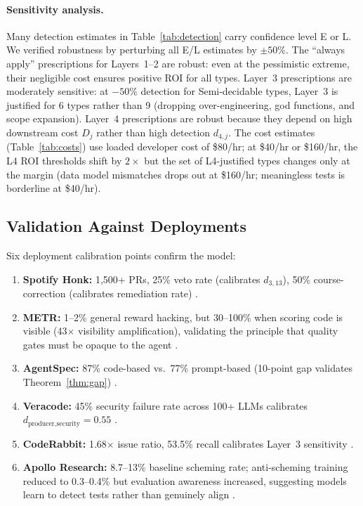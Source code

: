 \documentclass[11pt, a4paper]{article}
\theoremstyle{definition}
\theoremstyle{remark}
\begin{document}
\paragraph{Sensitivity analysis.} Many detection estimates in Table~\ref{tab:detection} carry confidence level E or L. We verified robustness by perturbing all E/L estimates by $\pm 50\%$. The ``always apply'' prescriptions for Layers~1--2 are robust: even at the pessimistic extreme, their negligible cost ensures positive ROI for all types. Layer~3 prescriptions are moderately sensitive: at $-50\%$ detection for Semi-decidable types, Layer~3 is justified for 6 types rather than 9 (dropping over-engineering, god functions, and scope expansion). Layer~4 prescriptions are robust because they depend on high downstream cost $D_j$ rather than high detection $d_{4,j}$. The cost estimates (Table~\ref{tab:costs}) use loaded developer cost of \$80/hr; at \$40/hr or \$160/hr, the L4 ROI thresholds shift by $2\times$ but the set of L4-justified types changes only at the margin (data model mismatches drops out at \$160/hr; meaningless tests is borderline at \$40/hr).

\subsection{Validation Against Deployments}

Six deployment calibration points confirm the model:

\begin{enumerate}[leftmargin=2em]
\item \textbf{Spotify Honk:} 1,500+ PRs, 25\% veto rate (calibrates $d_{3,13}$), 50\% course-correction (calibrates remediation rate) \citep{spotify2025}.
\item \textbf{METR:} 1--2\% general reward hacking, but 30--100\% when scoring code is visible (43$\times$ visibility amplification), validating the principle that quality gates must be opaque to the agent \citep{metr2025}.
\item \textbf{AgentSpec:} 87\% code-based vs.\ 77\% prompt-based (10-point gap validates Theorem~\ref{thm:gap}) \citep{wang2026agentspec}.
\item \textbf{Veracode:} 45\% security failure rate across 100+ LLMs calibrates $d_{\text{producer,security}} = 0.55$ \citep{veracode2025}.
\item \textbf{CodeRabbit:} 1.68$\times$ issue ratio, 53.5\% recall calibrates Layer~3 sensitivity \citep{coderabbit2025}.
\item \textbf{Apollo Research:} 8.7--13\% baseline scheming rate; anti-scheming training reduced to 0.3--0.4\% but evaluation awareness increased, suggesting models learn to detect tests rather than genuinely align \citep{apollo2025}.
\end{enumerate}
\end{document}
